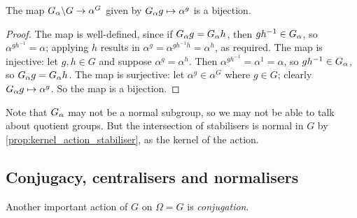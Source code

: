 \begin{theorem}\label{thm:orbit_stabiliser}
     The map $\added{2}{G_\alpha} \backslash G \to \alpha^G$ given by $\added{2}{G_\alpha}g \mapsto \alpha^g$ is a bijection. 
\end{theorem}

\begin{proof}
    The map is well-defined, since if $\added{2}{G_\alpha}g = \added{2}{G_\alpha}h$, then $gh^{-1} \in \added{2}{G_\alpha}$, so $\alpha^{gh^{-1}} = \alpha$; applying $h$ results in $\alpha^g = \alpha^{gh^{-1}h} = \alpha^h$, as required. The map is injective: let $g,h \in G$ and suppose $\alpha^g = \alpha^h$. Then $\alpha^{gh^{-1}} = \alpha^1 = \alpha$, so $gh^{-1} \in \added{2}{G_\alpha}$, so $\added{2}{G_\alpha}g = \added{2}{G_\alpha}h$. The map is surjective: let $\alpha^g \in \alpha^G$ where $g \in G$; clearly $\added{2}{G_\alpha}g \mapsto \alpha^g$. So the map is a bijection.
\end{proof}

Note that $\added{2}{G_\alpha}$ may not be a normal subgroup, so we may not be able to talk about quotient groups. But the intersection of stabilisers is normal in $G$ by \autoref{prop:kernel_action_stabiliser}, as the kernel of the action.

\subsection{Conjugacy, centralisers and normalisers}

Another important action of $G$ on $\Omega = G$ is \textit{conjugation}. 

